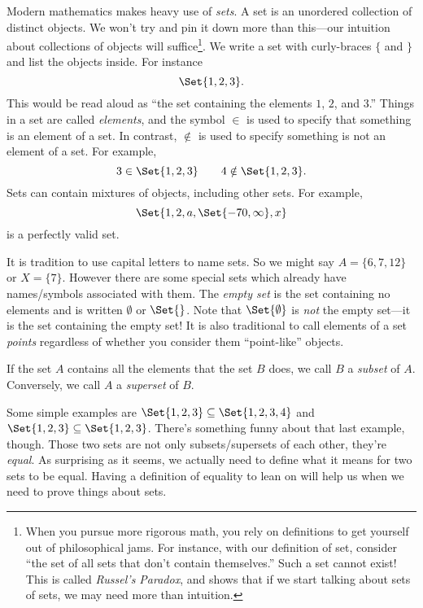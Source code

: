 Modern mathematics makes heavy use of \emph{sets}.  
A set is an unordered collection of distinct objects.  We won't try and pin
it down more than this---our intuition about collections
of objects will suffice\footnote{ When you pursue more rigorous math,
you rely on definitions to get yourself out of philosophical jams.  For instance,
with our definition of set, consider ``the set of all sets that don't
contain themselves.''  Such a set cannot exist!
This is called \emph{Russel's Paradox}, and shows
that if we start talking about sets of sets, we may need more than
intuition.}. We write a set with curly-braces $\{$ and $\}$ and
list the objects inside.  For instance
\[
	\Set{1,2,3}.
\]
This would be read aloud as ``the set containing the elements $1$, $2$, and $3$.''
Things in a set are called \emph{elements},
and the symbol $\in$\index{$\in$} is used to specify that something is an element of a set.
In contrast, $\notin$ is used to specify something is not an element of a set.  For example,
\[
	3\in\Set{1,2,3}\qquad 4\notin\Set{1,2,3}.
\]
Sets can contain mixtures of objects, including other sets.  For example,
\[
	\Set{1,2,a,\Set{-70,\infty}, x}
\]
is a perfectly valid set.

It is tradition to use capital letters to name sets.  So we might say $A=\{6,7,12\}$
or $X=\{7\}$.  However there are some special sets which
already have names/symbols associated with them.
The \emph{empty set} is the set containing no elements
and is written $\emptyset$ or $\Set{}$.  Note that $\Set{\emptyset}$ is \emph{not}
the empty set---it is the set containing the empty set!  It is also traditional
to call elements of a set \emph{points} regardless of whether you
consider them ``point-like'' objects.

If the set $A$ contains all the elements that the set $B$ does, we call $B$ a \emph{subset}
of $A$. Conversely, we call $A$ a \emph{superset} of $B$.  

Some simple examples are $\Set{1,2,3}\subseteq \Set{1,2,3,4}$ and $\Set{1,2,3}\subseteq\Set{1,2,3}$.
There's something funny about that last example, though.  Those two sets are not only subsets/supersets
of each other, they're \emph{equal}.  As surprising as it seems, we actually need to define
what it means for two sets to be equal.
Having a definition of equality to lean on will help us when we need to prove things about sets.

